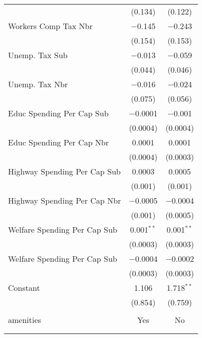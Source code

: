 \begin{table}[!htbp]
\begin{tabular}{@{\extracolsep{5pt}}lcc}
  & (0.134) & (0.122) \\ 
  Workers Comp Tax Nbr & $-$0.145 & $-$0.243 \\ 
  & (0.154) & (0.153) \\ 
  Unemp. Tax Sub & $-$0.013 & $-$0.059 \\ 
  & (0.044) & (0.046) \\ 
  Unemp. Tax Nbr & $-$0.016 & $-$0.024 \\ 
  & (0.075) & (0.056) \\ 
  Educ Spending Per Cap Sub & $-$0.0001 & $-$0.001 \\ 
  & (0.0004) & (0.0004) \\ 
  Educ Spending Per Cap Nbr & 0.0001 & 0.0001 \\ 
  & (0.0004) & (0.0003) \\ 
  Highway Spending Per Cap Sub & 0.0003 & 0.0005 \\ 
  & (0.001) & (0.001) \\ 
  Highway Spending Per Cap Nbr & $-$0.0005 & $-$0.0004 \\ 
  & (0.001) & (0.0005) \\ 
  Welfare Spending Per Cap Sub & 0.001$^{**}$ & 0.001$^{**}$ \\ 
  & (0.0003) & (0.0003) \\ 
  Welfare Spending Per Cap Sub & $-$0.0004 & $-$0.0002 \\ 
  & (0.0003) & (0.0003) \\ 
  Constant & 1.106 & 1.718$^{**}$ \\ 
  & (0.854) & (0.759) \\ 
 \hline \\[-1.8ex] 
amenities & Yes & No \\ 
\hline \\[-1.8ex] 
\hline 
\hline \\[-1.8ex] 
\end{tabular} 
\end{table} 
